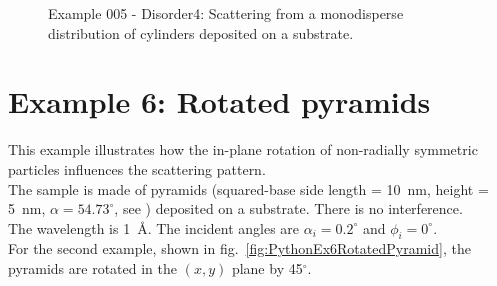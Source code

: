 \begin{figure}[H]
\hfill
{}
\hfill
{}
\hfill
\caption{Example 005 - Disorder4: Scattering from a monodisperse distribution of cylinders deposited on a substrate.}
\label{fig:PythonEx5Dis4}
\end{figure}

\newpage
\section{Example 6: Rotated pyramids}
This example illustrates how the in-plane rotation of non-radially symmetric particles influences the scattering pattern. \\
The sample is made of pyramids (squared-base side length = 10~nm, height = 5~nm, $\alpha=54.73^{\circ}$, see ) deposited on a substrate. There is no interference.\\
The wavelength is 1~\AA. The incident angles are $\alpha_i=0.2^{\circ}$ and $\phi_i=0^{\circ}$.\\
For the second example, shown in fig.~\ref{fig:PythonEx6RotatedPyramid}, the pyramids are rotated in the $(x,y)$ plane by 45$^{\circ}$.

